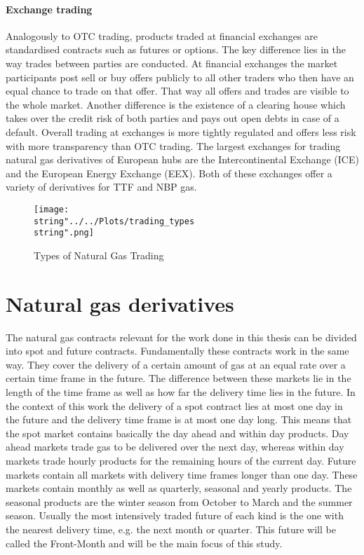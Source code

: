 \paragraph{Exchange trading}
Analogously to OTC trading, products traded at financial exchanges are standardised contracts such as futures or options. The key difference lies in the way trades between parties are conducted. At financial exchanges the market participants post sell or buy offers publicly to all other traders who then have an equal chance to trade on that offer. That way all offers and trades are visible to the whole market. Another difference is the existence of a clearing house which takes over the credit risk of both parties and pays out open debts in case of a default. Overall trading at exchanges is more tightly regulated and offers less risk with more transparency than OTC trading. The largest exchanges for trading natural gas derivatives of European hubs are the Intercontinental Exchange (ICE) and the European Energy Exchange (EEX). Both of these exchanges offer a variety of derivatives for TTF and NBP gas.

\begin{figure}[H]
  \centering
\texttt{[image: \\string"../../Plots/trading\_types\\string".png]}
  \caption{Types of Natural Gas Trading}\label{fig:trading_types}
\end{figure}

\section{Natural gas derivatives}
The natural gas contracts relevant for the work done in this thesis can be divided into spot and future contracts. Fundamentally these contracts work in the same way. They cover the delivery of a certain amount of gas at an equal rate over a certain time frame in the future. The difference between these markets lie in the length of the time frame as well as how far the delivery time lies in the future. In the context of this work the delivery of a spot contract lies at most one day in the future and the delivery time frame is at most one day long. This means that the spot market contains basically the day ahead and within day products. Day ahead markets trade gas to be delivered over the next day, whereas within day markets trade hourly products for the remaining hours of the current day. Future markets contain all markets with delivery time frames longer than one day. These markets contain monthly as well as quarterly, seasonal and yearly products. The seasonal products are the winter season from October to March and the summer season. Usually the most intensively traded future of each kind is the one with the nearest delivery time, e.g. the next month or quarter. This future will be called the Front-Month and will be the main focus of this study. 

